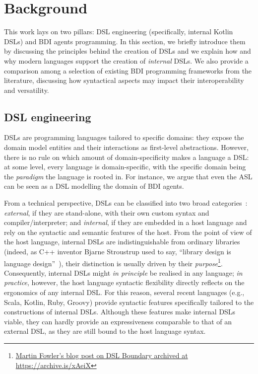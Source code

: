 \section{Background}
\label{sec:background}

This work lays on two pillars: \ac{DSL} engineering (specifically, internal Kotlin \acp{DSL}) and \ac{BDI} agents programming.
%
In this section,
we briefly introduce them by discussing the principles behind the creation of \acp{DSL}
and we explain how and why modern languages support the creation of \textit{internal} \acp{DSL}.
%
We also provide a comparison among a selection of existing \ac{BDI} programming frameworks from the literature,
discussing how syntactical aspects may impact their interoperability and versatility.

\subsection{\ac{DSL} engineering}
\label{subsec:internal-vs.-external-domain-specific-languages}
\acp{DSL} are programming languages tailored to specific domains:
they expose the domain model entities and their interactions as first-level abstractions.
%
However, there is no rule on which amount of domain-specificity makes a language a \ac{DSL}:
at some level, every language is domain-specific,
with the specific domain being the \emph{paradigm} the language is rooted in.
%
For instance,
we argue that even the \ac{ASL}
can be seen
as a \ac{DSL} modelling the domain of \ac{BDI} agents.

From a technical perspective,
\acp{DSL} can be classified into two broad categories~\cite{Riti2018}:
\emph{external}, if they are stand-alone, with their own custom syntax and compiler/interpreter;
and \emph{internal}, if they are embedded in a host language and rely on the syntactic and semantic features of the host.
%
From the point of view of the host language,
internal \acp{DSL} are indistinguishable from ordinary libraries
(indeed, as C++ inventor Bjarne Stroustrup used to say, ``library design is language design''~\cite{Stroustrup1997}),
their distinction is usually driven by their \emph{purpose}\footnote{
    \href{https://archive.is/xAeiX}{Martin Fowler's blog post on DSL Boundary archived at https://archive.is/xAeiX}
}.
%
Consequently,
internal \acp{DSL} might \emph{in principle} be realised in any language;
\emph{in practice}, however,
the host language syntactic flexibility directly reflects on the ergonomics of any internal \ac{DSL}.
For this reason,
several recent languages (e.g., Scala, Kotlin, Ruby, Groovy)
provide syntactic features specifically tailored to the constructions of internal \acp{DSL}.
%
Although these features make internal \acp{DSL} viable,
they can hardly provide an expressiveness comparable to that of an external \ac{DSL},
as they are still bound to the host language syntax.

